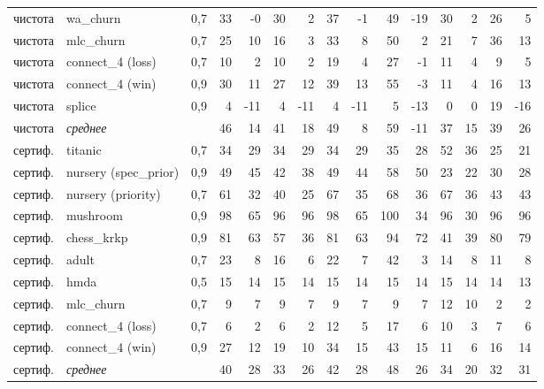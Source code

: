 \begin{tabular}{lllrrrrrrrrrrrr}
чистота & wa\_churn & 0{,}7 & 33 & -0 & 30 & 2 & 37 & -1 & 49 & -19 & 30 & 2 & 26 & 5\\
чистота & mlc\_churn & 0{,}7 & 25 & 10 & 16 & 3 & 33 & 8 & 50 & 2 & 21 & 7 & 36 & 13\\
чистота & connect\_4 (loss) & 0{,}7 & 10 & 2 & 10 & 2 & 19 & 4 & 27 & -1 & 11 & 4 & 9 & 5\\
чистота & connect\_4 (win) & 0{,}9 & 30 & 11 & 27 & 12 & 39 & 13 & 55 & -3 & 11 & 4 & 16 & 13\\
чистота & splice & 0{,}9 & 4 & -11 & 4 & -11 & 4 & -11 & 5 & -13 & 0 & 0 & 19 & -16\\
чистота & \emph{среднее} & & 46 & 14 & 41 & 18 & 49 & 8 & 59 & -11 & 37 & 15 & 39 & 26\\
\midrule
сертиф. & titanic & 0{,}7 & 34 & 29 & 34 & 29 & 34 & 29 & 35 & 28 & 52 & 36 & 25 & 21\\
сертиф. & nursery (spec\_prior) & 0{,}9 & 49 & 45 & 42 & 38 & 49 & 44 & 58 & 50 & 23 & 22 & 30 & 28\\
сертиф. & nursery (priority) & 0{,}7 & 61 & 32 & 40 & 25 & 67 & 35 & 68 & 36 & 67 & 36 & 43 & 43\\
сертиф. & mushroom & 0{,}9 & 98 & 65 & 96 & 96 & 98 & 65 & 100 & 34 & 96 & 30 & 96 & 96\\
сертиф. & chess\_krkp & 0{,}9 & 81 & 63 & 57 & 36 & 81 & 63 & 94 & 72 & 41 & 39 & 80 & 79\\
сертиф. & adult & 0{,}7 & 23 & 8 & 16 & 6 & 22 & 7 & 42 & 3 & 14 & 8 & 11 & 8\\
сертиф. & hmda & 0{,}5 & 15 & 14 & 15 & 14 & 15 & 14 & 15 & 14 & 15 & 14 & 14 & 13\\
сертиф. & mlc\_churn & 0{,}7 & 9 & 7 & 9 & 7 & 9 & 7 & 9 & 7 & 12 & 10 & 2 & 2\\
сертиф. & connect\_4 (loss) & 0{,}7 & 6 & 2 & 6 & 2 & 12 & 5 & 17 & 6 & 10 & 3 & 7 & 6\\
сертиф. & connect\_4 (win) & 0{,}9 & 27 & 12 & 19 & 10 & 34 & 15 & 43 & 15 & 11 & 6 & 16 & 14\\
сертиф. & \emph{среднее} & & 40 & 28 & 33 & 26 & 42 & 28 & 48 & 26 & 34 & 20 & 32 & 31\\
\bottomrule
\end{tabular}
